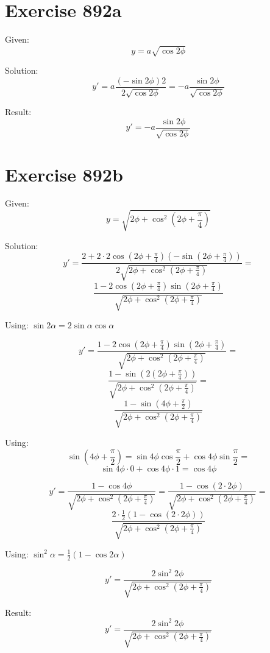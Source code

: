 \documentclass[a4paper, 10pt]{scrartcl}
\begin{document}
\section{Exercise 892a}

Given:
\[
y = a\sqrt{\cos{2\phi}}
\]

Solution:
\[
y' = a\frac{(-\sin{2\phi})2}{2\sqrt{\cos{2\phi}}} = -a\frac{\sin{2\phi}}{\sqrt{\cos{2\phi}}}
\]

Result:
\[
y' = -a\frac{\sin{2\phi}}{\sqrt{\cos{2\phi}}}
\]

\section{Exercise 892b}

Given:
\[
y = \sqrt{2\phi + \cos^{2}{(2\phi + \frac{\pi}{4})}}
\]

Solution:
\[
y' = \frac{2 + 2\cdot2\cos{(2\phi + \frac{\pi}{4})}(-\sin{(2\phi + \frac{\pi}{4})})}{2\sqrt{2\phi + \cos^{2}{(2\phi + \frac{\pi}{4})}}} =
\]
\[
\frac{1 - 2\cos{(2\phi + \frac{\pi}{4})}\sin{(2\phi + \frac{\pi}{4})}}{\sqrt{2\phi + \cos^{2}{(2\phi + \frac{\pi}{4})}}}
\]

Using: $\sin{2\alpha} = 2\sin{\alpha}\cos{\alpha}$

\[
y' = \frac{1 - 2\cos{(2\phi + \frac{\pi}{4})}\sin{(2\phi + \frac{\pi}{4})}}{\sqrt{2\phi + \cos^{2}{(2\phi + \frac{\pi}{4})}}} =
\]
\[
\frac{1 - \sin{(2(2\phi + \frac{\pi}{4}))}}{\sqrt{2\phi + \cos^{2}{(2\phi + \frac{\pi}{4})}}} =
\]
\[
\frac{1 - \sin{(4\phi + \frac{\pi}{2})}}{\sqrt{2\phi + \cos^{2}{(2\phi + \frac{\pi}{4})}}}
\]

Using:
\[
\sin{(4\phi + \frac{\pi}{2})} = \sin{4\phi}\cos{\frac{\pi}{2}} + \cos{4\phi}\sin{\frac{\pi}{2}} =
\]
\[
\sin{4\phi}\cdot0 + \cos{4\phi}\cdot1 = \cos{4\phi}
\]

\[
y' = \frac{1 - \cos{4\phi}}{\sqrt{2\phi + \cos^{2}{(2\phi + \frac{\pi}{4})}}} =
\frac{1 - \cos{(2\cdot2\phi)}}{\sqrt{2\phi + \cos^{2}{(2\phi + \frac{\pi}{4})}}} =
\]
\[
\frac{2\cdot\frac{1}{2}(1 - \cos{(2\cdot2\phi)})}{\sqrt{2\phi + \cos^{2}{(2\phi + \frac{\pi}{4})}}}
\]

Using: $\sin^{2}{\alpha} = \frac{1}{2}(1 - \cos{2\alpha})$

\[
y' = \frac{2\sin^{2}{2\phi}}{\sqrt{2\phi + \cos^{2}{(2\phi + \frac{\pi}{4})}}}
\]

Result:
\[
y' = \frac{2\sin^{2}{2\phi}}{\sqrt{2\phi + \cos^{2}{(2\phi + \frac{\pi}{4})}}}
\]
\end{document}
